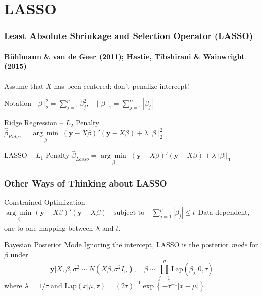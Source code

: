 \section{LASSO}
\begin{frame}
  \frametitle{Least Absolute Shrinkage and Selection Operator (LASSO)}
  \framesubtitle{B\"{u}hlmann \& van de Geer (2011); Hastie, Tibshirani \& Wainwright (2015)}

  Assume that $X$ has been centered: don't penalize intercept!

  \begin{block}{Notation}
    $\left| \left| \beta\right| \right|_2^2 = \sum_{j=1}^p \beta_j^2, \quad \left| \left| \beta\right| \right|_1 = \sum_{j=1}^p |\beta_j|$
  \end{block}

  \begin{block}{Ridge Regression -- $L_2$ Penalty}
	$\widehat{\beta}_{Ridge} =\underset{\beta}{\arg \min}\; (\mathbf{y} -  X\beta)' (\mathbf{y} - X\beta) + \lambda \left| \left| \beta\right| \right|_2^2$
  \end{block}

  \begin{block}{LASSO -- $L_1$ Penalty}
	$\widehat{\beta}_{Lasso} =\underset{\beta}{\arg \min}\; (\mathbf{y} - X\beta)' (\mathbf{y} - X\beta) + \lambda \left| \left| \beta\right| \right|_1$
  \end{block}

  
\end{frame}
\begin{frame}
  \frametitle{Other Ways of Thinking about LASSO}
  \begin{block}{Constrained Optimization}
	$\underset{\beta}{\arg \min} (\mathbf{y}  - X\beta)' (\mathbf{y} - X\beta) \quad \mbox{subject to}\quad \sum_{j=1}^p |\beta_j| \leq t$
Data-dependent, one-to-one mapping between $\lambda$ and $t$.
\end{block}

\begin{block}{Bayesian Posterior Mode}
  Ignoring the intercept, LASSO is the posterior \emph{mode} for $\beta$ under
		\[\mathbf{y}|X,\beta, \sigma^2 \sim N(X\beta,\sigma^2 I_n), \quad
    \beta\sim \prod_{j=1}^p \mbox{Lap}(\beta_j|0, \tau)\]
  where  
  $\lambda= 1/\tau$ and 
  $\mbox{Lap}(x|\mu,\tau)= (2\tau)^{-1}\exp\left \{-\tau^{-1}|x-\mu| \right\}$
\end{block}
\end{frame}
